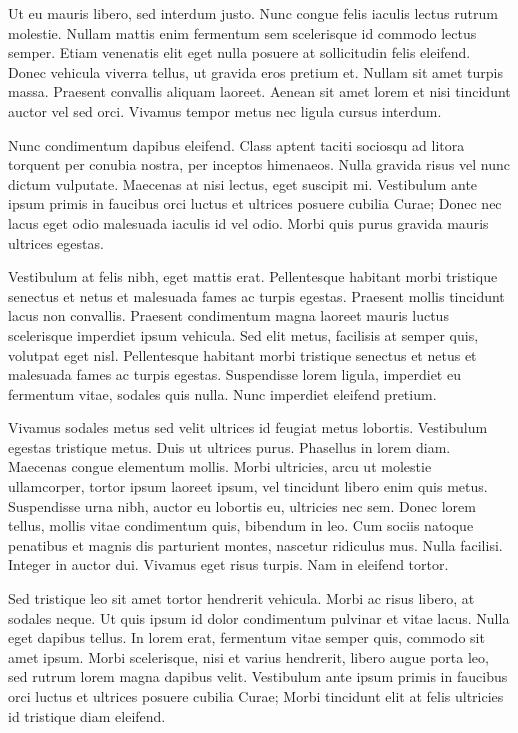 \documentclass[a4paper]{article}
\begin{document}
Ut eu mauris libero, sed interdum justo. Nunc congue felis iaculis lectus rutrum molestie. Nullam mattis enim fermentum sem scelerisque id commodo lectus semper. Etiam venenatis elit eget nulla posuere at sollicitudin felis eleifend. Donec vehicula viverra tellus, ut gravida eros pretium et. Nullam sit amet turpis massa. Praesent convallis aliquam laoreet. Aenean sit amet lorem et nisi tincidunt auctor vel sed orci. Vivamus tempor metus nec ligula cursus interdum.

Nunc condimentum dapibus eleifend. Class aptent taciti sociosqu ad litora torquent per conubia nostra, per inceptos himenaeos. Nulla gravida risus vel nunc dictum vulputate. Maecenas at nisi lectus, eget suscipit mi. Vestibulum ante ipsum primis in faucibus orci luctus et ultrices posuere cubilia Curae; Donec nec lacus eget odio malesuada iaculis id vel odio. Morbi quis purus gravida mauris ultrices egestas.

Vestibulum at felis nibh, eget mattis erat. Pellentesque habitant morbi tristique senectus et netus et malesuada fames ac turpis egestas. Praesent mollis tincidunt lacus non convallis. Praesent condimentum magna laoreet mauris luctus scelerisque imperdiet ipsum vehicula. Sed elit metus, facilisis at semper quis, volutpat eget nisl. Pellentesque habitant morbi tristique senectus et netus et malesuada fames ac turpis egestas. Suspendisse lorem ligula, imperdiet eu fermentum vitae, sodales quis nulla. Nunc imperdiet eleifend pretium.

Vivamus sodales metus sed velit ultrices id feugiat metus lobortis. Vestibulum egestas tristique metus. Duis ut ultrices purus. Phasellus in lorem diam. Maecenas congue elementum mollis. Morbi ultricies, arcu ut molestie ullamcorper, tortor ipsum laoreet ipsum, vel tincidunt libero enim quis metus. Suspendisse urna nibh, auctor eu lobortis eu, ultricies nec sem. Donec lorem tellus, mollis vitae condimentum quis, bibendum in leo. Cum sociis natoque penatibus et magnis dis parturient montes, nascetur ridiculus mus. Nulla facilisi. Integer in auctor dui. Vivamus eget risus turpis. Nam in eleifend tortor.

Sed tristique leo sit amet tortor hendrerit vehicula. Morbi ac risus libero, at sodales neque. Ut quis ipsum id dolor condimentum pulvinar et vitae lacus. Nulla eget dapibus tellus. In lorem erat, fermentum vitae semper quis, commodo sit amet ipsum. Morbi scelerisque, nisi et varius hendrerit, libero augue porta leo, sed rutrum lorem magna dapibus velit. Vestibulum ante ipsum primis in faucibus orci luctus et ultrices posuere cubilia Curae; Morbi tincidunt elit at felis ultricies id tristique diam eleifend.
\end{document}
